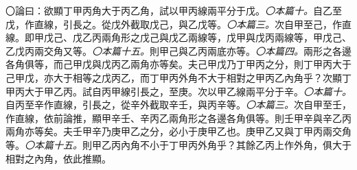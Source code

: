 \documentclass[12pt,b5paper,landscape]{article}
\newcommand{\ccom}[1]{{\footnotesize \emph{〇#1}}}
\newcommand{\bcom}[1]{〇#1}
\begin{document}
\begin{multicols}{2}
\bcom{論曰：欲顯丁甲丙角大于丙乙角，試以甲丙線兩平分于戊。\ccom{本篇十。}自乙至戊，作直線，引長之。從戊外截取戊己，與乙戊等。\ccom{本篇三。}次自甲至己，作直線。即甲戊己、戊乙丙兩角形之戊己與戊乙兩線等，戊甲與戊丙兩線等，甲戊己、乙戊丙兩交角又等。\ccom{本篇十五。}則甲己與乙丙兩底亦等。\ccom{本篇四。}兩形之各邊各角俱等，而己甲戊與戊丙乙兩角亦等矣。夫己甲戊乃丁甲丙之分，則丁甲丙大于己甲戊，亦大于相等之戊丙乙，而丁甲丙外角不大于相對之甲丙乙內角乎？次顯丁甲丙大于甲乙丙。試自丙甲線引長之，至庚。次以甲乙線兩平分于辛。\ccom{本篇十。}自丙至辛作直線，引長之，從辛外截取辛壬，與丙辛等。\ccom{本篇三。}次自甲至壬，作直線，依前論推，顯甲辛壬、辛丙乙兩角形之各邊各角俱等。則壬甲辛與辛乙丙兩角亦等矣。夫壬甲辛乃庚甲乙之分，必小于庚甲乙也。庚甲乙又與丁甲丙兩交角等。\ccom{本篇十五。}則甲乙丙內角不小于丁甲丙外角乎？其餘乙丙上作外角，俱大于相對之內角，依此推顯。}


\end{multicols}
\end{document}
